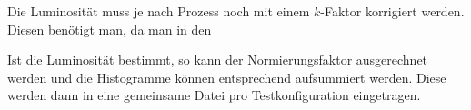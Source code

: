 \begin{table}
  \centering
  \caption{Wirkungsquerschnitte der Hintergründe}
  \label{tab:wqs}
\end{table}

Die Luminosität muss je nach Prozess noch mit einem $k$-Faktor korrigiert
werden. Diesen benötigt man, da man in den 

Ist die Luminosität bestimmt, so kann der Normierungsfaktor ausgerechnet werden
und die Histogramme können entsprechend aufsummiert werden. Diese werden dann in
eine gemeinsame Datei pro Testkonfiguration eingetragen.
